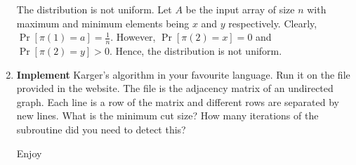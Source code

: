 \documentclass[11pt]{article}
\begin{document}
\begin{enumerate}
	\Sol The distribution is not uniform. Let $A$ be the input array of size $n$ with maximum and minimum elements being $x$ and $y$ respectively. Clearly, $\Pr[\pi(1) = a] = \frac{1}{n}$. However, $\Pr[\pi(2) = x] = 0$ and $\Pr[\pi(2) = y] > 0$. Hence, the distribution is not uniform.
	
	\item {\bf Implement} Karger's algorithm in your favourite language. Run it on the file provided in the website. The file is the adjacency matrix of an undirected graph. Each line is a row of the matrix and different rows are separated by new lines. What is the minimum cut size? How many iterations of the subroutine did you need to detect this?
	
	\Sol Enjoy \smiley{}
	

\end{enumerate}
\end{document}
